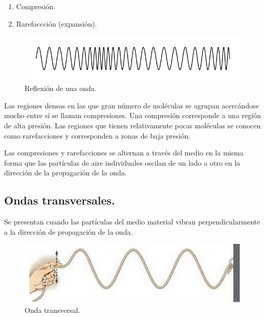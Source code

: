 \documentclass[12pt, letter]{article}
\begin{document}
\begin{enumerate}
\item Compresión.
\item Rarefaccción (expansión).
\end{enumerate}
{
\begin{figure}[H]
    \centering
    \includegraphics[scale=0.7]{Imagenes/Reflexion_Ondas_05.png}
    \caption{Reflexión de una onda.}
\end{figure}
}
Las regiones densas en las que gran número de moléculas se agrupan acercándose mucho entre sí se llaman compresiones. Una compresión corresponde a una región de alta presión. Las regiones que tienen relativamente pocas moléculas se conocen como rarefacciones y corresponden a zonas de baja presión.

Las compresiones y rarefacciones se alternan a través del medio en la misma forma que las partículas de aire individuales oscilan de un lado a otro en la dirección de la propagación de la onda.
    
% 

\subsection{Ondas transversales.}

Se presentan cuando las partículas del medio material vibran perpendicularmente a la dirección de propagación de la onda.
\begin{figure}[H]
    \centering
    \includegraphics[scale=0.35]{Imagenes/Ondas_08.jpg}
    \caption{Onda transversal.}
\end{figure}
\end{document}
